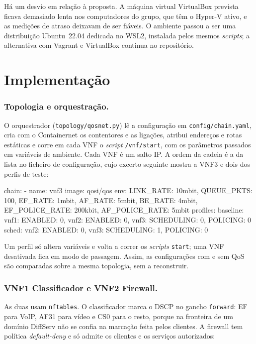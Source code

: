 \documentclass[a4paper]{llncs}
\begin{document}
Há um desvio em relação à proposta. A máquina virtual VirtualBox prevista ficava
demasiado lenta nos computadores do grupo, que têm o Hyper-V ativo, e as medições de
atraso deixavam de ser fiáveis. O ambiente passou a ser uma distribuição Ubuntu~22.04
dedicada no WSL2, instalada pelos mesmos \emph{scripts}; a alternativa com Vagrant e
VirtualBox continua no repositório.

\section{Implementação}

\subsubsection{Topologia e orquestração.}
O orquestrador (\texttt{topology/qosnet.py}) lê a configuração em
\texttt{config/chain.yaml}, cria com o Containernet os contentores e as ligações,
atribui endereços e rotas estáticas e corre em cada VNF o \emph{script}
\texttt{/vnf/start}, com os parâmetros passados em variáveis de ambiente. Cada VNF é um salto IP. A ordem da cadeia é a da
lista no ficheiro de configuração, cujo excerto seguinte mostra a VNF3 e dois dos
perfis de teste:

\begin{code}
chain:
  - name: vnf3
    image: qosi/qos
    env: {LINK_RATE: 10mbit, QUEUE_PKTS: 100, EF_RATE: 1mbit, AF_RATE: 5mbit,
          BE_RATE: 4mbit, EF_POLICE_RATE: 200kbit, AF_POLICE_RATE: 5mbit}
profiles:
  baseline:   {vnf1: {ENABLED: 0}, vnf2: {ENABLED: 0}, vnf3: {SCHEDULING: 0, POLICING: 0}}
  sched:      {vnf2: {ENABLED: 0}, vnf3: {SCHEDULING: 1, POLICING: 0}}
\end{code}

Um perfil só altera variáveis e volta a correr os \emph{scripts} \texttt{start}; uma
VNF desativada fica em modo de passagem. Assim, as configurações com e sem QoS são
comparadas sobre a mesma topologia, sem a reconstruir.

\subsubsection{VNF1 Classificador e VNF2 Firewall.}
As duas usam \texttt{nftables}. O classificador marca o DSCP no gancho
\texttt{forward}: EF para VoIP, AF31 para vídeo e CS0 para o resto, porque na fronteira
de um domínio DiffServ não se confia na marcação feita pelos clientes. A firewall tem
política \emph{default-deny} e só admite os clientes e os serviços autorizados:
\end{document}

